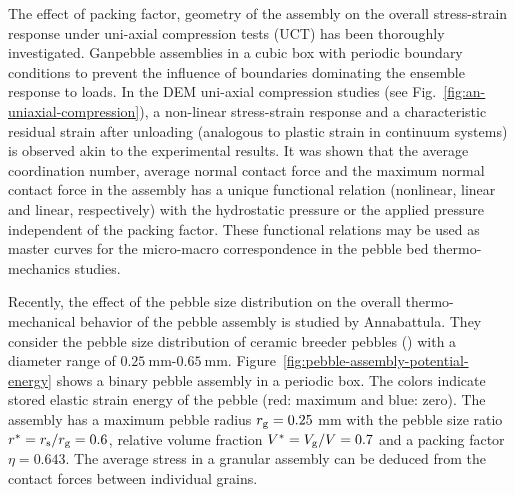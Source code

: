 The effect of packing factor, geometry of the assembly on the overall stress-strain response under uni-axial compression tests (UCT) has been thoroughly investigated.\cite{Gan:2010uq} Gan\etal pebble assemblies in a cubic box with periodic boundary conditions to prevent the influence of boundaries dominating the ensemble response to loads.\cite{Gilabert2007} In the DEM uni-axial compression studies (see Fig.~\ref{fig:an-uniaxial-compression}), a non-linear stress-strain response and a characteristic residual strain after unloading (analogous to plastic strain in continuum systems) is observed akin to the experimental results.\cite{Reimann:2000tw} It was shown that the average coordination number, average normal contact force and the maximum normal contact force in the assembly has a unique functional relation (nonlinear, linear and linear, respectively) with the hydrostatic pressure or the applied pressure independent of the packing factor.\cite{Gan:2010uq,An20071393} These functional relations may be used as master curves for the micro-macro correspondence in the pebble bed thermo-mechanics studies.

Recently, the effect of the pebble size distribution on the overall thermo-mechanical behavior of the pebble assembly is studied by Annabattula\etal\cite{Annabattula2011}. They consider the pebble size distribution of ceramic breeder pebbles (\lis) with a diameter range of $0.25\ \mathrm{mm}$-$0.65\ \mathrm{mm}$. Figure~\ref{fig:pebble-assembly-potential-energy} shows a binary pebble assembly in a periodic box. The colors indicate stored elastic strain energy of the pebble (red: maximum and blue: zero). The assembly has a maximum pebble radius $r_{\mathrm{g}}=0.25$ mm with the pebble size ratio $r^{*}=r_{\mathrm{s}}/r_{\mathrm{g}}=0.6$, relative volume fraction $V^{*}=V_{\mathrm{g}}/V=0.7$ and a packing factor $\eta=0.643$. The average stress in a granular assembly can be deduced from the contact forces between individual grains.

